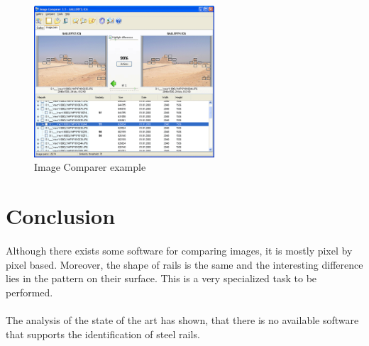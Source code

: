 \begin{figure}[h]
	\centering
	\includegraphics[width=0.6\textwidth]{images/image_comparer}
	\caption{Image Comparer example}
	\label{fig:image_comparator}
\end{figure}


\section{Conclusion}
\paragraph{}
Although there exists some software for comparing images, it is mostly pixel by pixel based. Moreover, the shape of rails is the same and the interesting difference lies in the pattern on their surface. This is a very specialized task to be performed.

\paragraph{}
The analysis of the state of the art has shown, that there is no available software that supports the identification of steel rails.